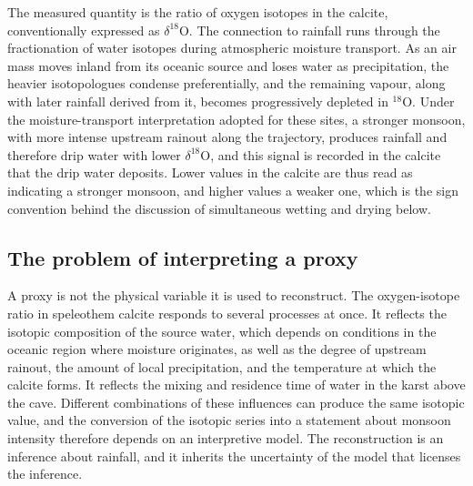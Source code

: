 \documentclass[11pt]{article}
\theoremstyle{definition}
\begin{document}
The measured quantity is the ratio of oxygen isotopes in the calcite, conventionally expressed as $\delta^{18}\mathrm{O}$. The connection to rainfall runs through the fractionation of water isotopes during atmospheric moisture transport. As an air mass moves inland from its oceanic source and loses water as precipitation, the heavier isotopologues condense preferentially, and the remaining vapour, along with later rainfall derived from it, becomes progressively depleted in $^{18}\mathrm{O}$. Under the moisture-transport interpretation adopted for these sites, a stronger monsoon, with more intense upstream rainout along the trajectory, produces rainfall and therefore drip water with lower $\delta^{18}\mathrm{O}$, and this signal is recorded in the calcite that the drip water deposits. Lower values in the calcite are thus read as indicating a stronger monsoon, and higher values a weaker one, which is the sign convention behind the discussion of simultaneous wetting and drying below.

\subsection{The problem of interpreting a proxy}

A proxy is not the physical variable it is used to reconstruct. The oxygen-isotope ratio in speleothem calcite responds to several processes at once. It reflects the isotopic composition of the source water, which depends on conditions in the oceanic region where moisture originates, as well as the degree of upstream rainout, the amount of local precipitation, and the temperature at which the calcite forms. It reflects the mixing and residence time of water in the karst above the cave. Different combinations of these influences can produce the same isotopic value, and the conversion of the isotopic series into a statement about monsoon intensity therefore depends on an interpretive model. The reconstruction is an inference about rainfall, and it inherits the uncertainty of the model that licenses the inference.
\end{document}
